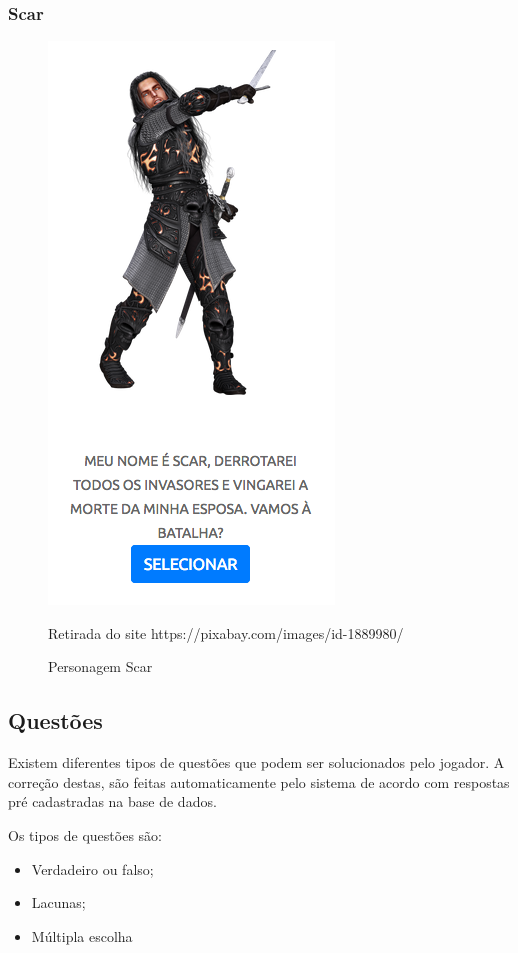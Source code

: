 \subsubsection{Scar}
\begin{figure}[h]
	\centering
	\includegraphics[keepaspectratio=true,scale=0.6]{figuras/scar.png}
	\caption{Personagem Scar}
	Retirada do site https://pixabay.com/images/id-1889980/
	\label{scar}
\end{figure}

\subsection{Questões}
Existem diferentes tipos de questões que podem ser solucionados pelo jogador. A correção destas, são feitas automaticamente
pelo sistema de acordo com respostas pré cadastradas na base de dados.

Os  tipos de questões são:

\begin{itemize}
	\item Verdadeiro ou falso;
	\item Lacunas;
	\item Múltipla escolha
\end{itemize}

